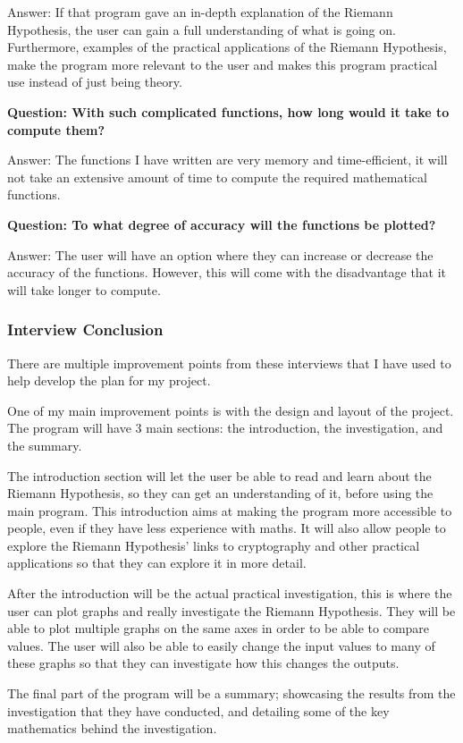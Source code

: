 \documentclass[12pt]{article}
\begin{document}
Answer: If that program gave an in-depth explanation of the Riemann Hypothesis, the user can gain a full understanding of what is going on. Furthermore, examples of the practical applications of the Riemann Hypothesis, make the program more relevant to the user and makes this program practical use instead of just being theory.

\textbf{Question: With such complicated functions, how long would it take to compute them?}

Answer: The functions I have written are very memory and time-efficient, it will not take an extensive amount of time to compute the required mathematical functions.

\textbf{Question: To what degree of accuracy will the functions be plotted?}

Answer: The user will have an option where they can increase or decrease the accuracy of the functions. However, this will come with the disadvantage that it will take longer to compute.

\subsubsection{Interview Conclusion}
There are multiple improvement points from these interviews that I have used to help develop the plan for my project.

One of my main improvement points is with the design and layout of the project. The program will have 3 main sections: the introduction, the investigation, and the summary.

The introduction section will let the user be able to read and learn about the Riemann Hypothesis, so they can get an understanding of it, before using the main program. This introduction aims at making the program more accessible to people, even if they have less experience with maths. It will also allow people to explore the Riemann Hypothesis’ links to cryptography and other practical applications so that they can explore it in more detail.

After the introduction will be the actual practical investigation, this is where the user can plot graphs and really investigate the Riemann Hypothesis. They will be able to plot multiple graphs on the same axes in order to be able to compare values. The user will also be able to easily change the input values to many of these graphs so that they can investigate how this changes the outputs.

The final part of the program will be a summary; showcasing the results from the investigation that they have conducted, and detailing some of the key mathematics behind the investigation.
\end{document}
